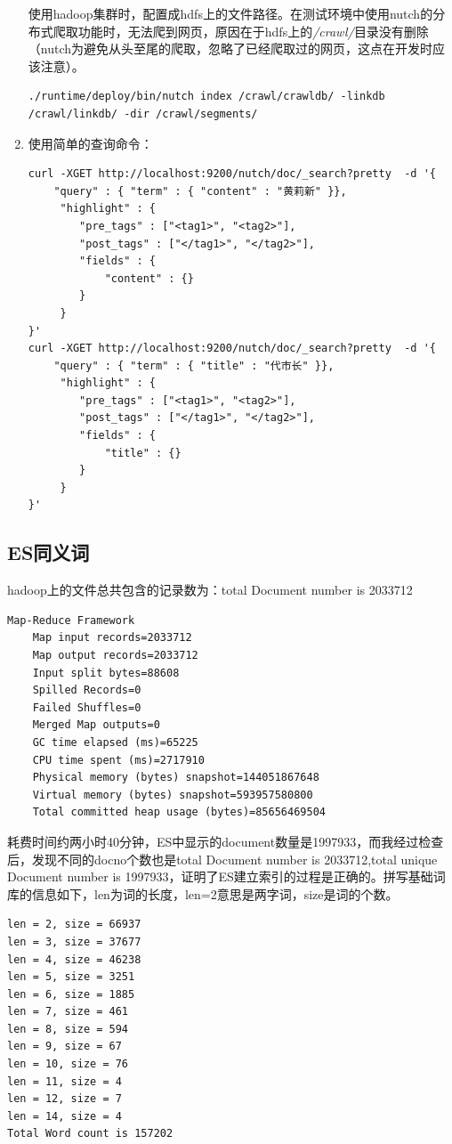 \begin{enumerate}[(1)]
\begin{verbatim}
\end{verbatim}
使用hadoop集群时，配置成hdfs上的文件路径。在测试环境中使用nutch的分布式爬取功能时，无法爬到网页，原因在于hdfs上的\textsl{/crawl/}目录没有删除（nutch为避免从头至尾的爬取，忽略了已经爬取过的网页，这点在开发时应该注意）。
\begin{verbatim}
./runtime/deploy/bin/nutch index /crawl/crawldb/ -linkdb /crawl/linkdb/ -dir /crawl/segments/
\end{verbatim}
\item 使用简单的查询命令：
\begin{verbatim}
curl -XGET http://localhost:9200/nutch/doc/_search?pretty  -d '{
    "query" : { "term" : { "content" : "黄莉新" }},
     "highlight" : {
        "pre_tags" : ["<tag1>", "<tag2>"],
        "post_tags" : ["</tag1>", "</tag2>"],
        "fields" : {
            "content" : {}
        }
     }
}'
curl -XGET http://localhost:9200/nutch/doc/_search?pretty  -d '{
    "query" : { "term" : { "title" : "代市长" }},
     "highlight" : {
        "pre_tags" : ["<tag1>", "<tag2>"],
        "post_tags" : ["</tag1>", "</tag2>"],
        "fields" : {
            "title" : {}
        }
     }
}'
\end{verbatim}
\end{enumerate}
\subsection{ES同义词}
hadoop上的文件总共包含的记录数为：total Document number is 2033712
\begin{verbatim}
Map-Reduce Framework
	Map input records=2033712
	Map output records=2033712
	Input split bytes=88608
	Spilled Records=0
	Failed Shuffles=0
	Merged Map outputs=0
	GC time elapsed (ms)=65225
	CPU time spent (ms)=2717910
	Physical memory (bytes) snapshot=144051867648
	Virtual memory (bytes) snapshot=593957580800
	Total committed heap usage (bytes)=85656469504
\end{verbatim}
\par 耗费时间约两小时40分钟，ES中显示的document数量是1997933，而我经过检查后，发现不同的docno个数也是total Document number is 2033712,total unique Document number is 1997933，证明了ES建立索引的过程是正确的。拼写基础词库的信息如下，len为词的长度，len=2意思是两字词，size是词的个数。
\begin{verbatim}
len = 2, size = 66937
len = 3, size = 37677
len = 4, size = 46238
len = 5, size = 3251
len = 6, size = 1885
len = 7, size = 461
len = 8, size = 594
len = 9, size = 67
len = 10, size = 76
len = 11, size = 4
len = 12, size = 7
len = 14, size = 4
Total Word count is 157202
\end{verbatim}

